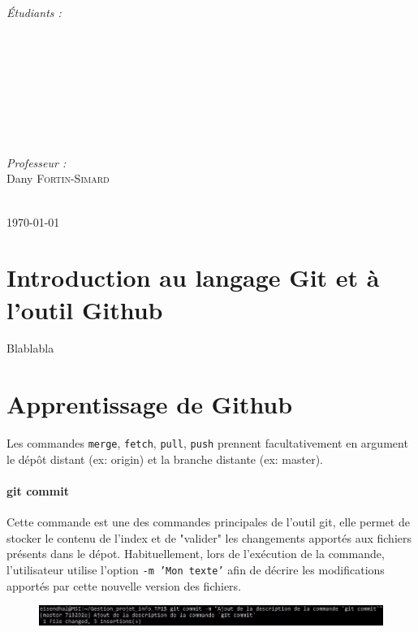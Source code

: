 \documentclass[11pt,canadien]{article}
\begin{document}
\begin{titlepage}
\begin{minipage}{0.4\textwidth}
\begin{flushleft} \large
\emph{Étudiants :}
\\ \antoine
\\ \estelle
\\ \joffrey
\\ \julien
\\ \karen
\\ \kevin
\\ \valentin
\end{flushleft}
\end{minipage}
~
\begin{minipage}{0.4\textwidth}
\begin{flushright} \large
\emph{Professeur :}\\
Dany \textsc{Fortin-Simard}
\end{flushright}
\end{minipage}\\[2cm]


{\large \today}\\[2cm]

\vfill %

\end{titlepage}

\newpage
\tableofcontents

\section{Introduction au langage Git et à l'outil Github}
Blablabla

\section{Apprentissage de Github}
Les commandes \texttt{merge}, \texttt{fetch}, \texttt{pull}, \texttt{push} prennent facultativement en argument le dépôt distant (ex: origin) et la branche distante (ex: master).

\paragraph{git commit}Cette commande est une des commandes principales de l'outil git, elle permet de stocker le contenu de l'index et de "valider" les changements apportés aux fichiers présents dans le dépot. Habituellement, lors de l'exécution de la commande, l'utilisateur utilise l'option \texttt{-m 'Mon texte'} afin de décrire les modifications apportés par cette nouvelle version des fichiers.
\begin{figure}[H]
	\centering
	\includegraphics[width=\textwidth]{images/git_commit.jpg}
\end{figure}
\end{document}
